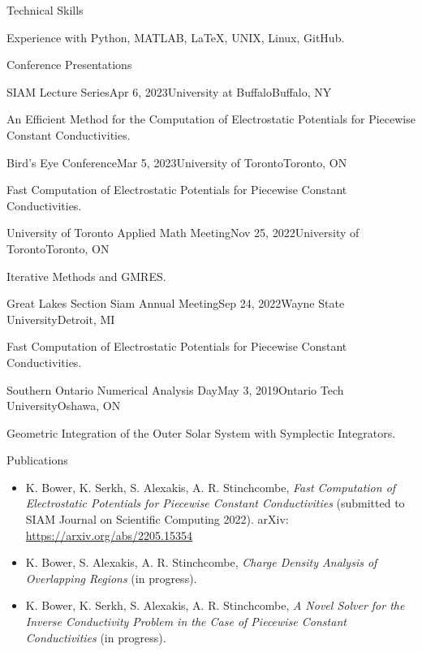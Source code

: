 \documentclass{resume}
\begin{document}
\begin{rSection}{Technical Skills}

{\normalfont Experience with Python, MATLAB, LaTeX, UNIX, Linux, GitHub.}

\end{rSection}

\begin{rSection}{Conference Presentations}

\begin{rSubsection}{SIAM Lecture Series}{Apr 6, 2023}{University at Buffalo}{Buffalo, NY}
\item An Efficient Method for the Computation of Electrostatic Potentials for Piecewise Constant Conductivities.
\end{rSubsection}

\begin{rSubsection}{Bird's Eye Conference}{Mar 5, 2023}{University of Toronto}{Toronto, ON}
\item Fast Computation of Electrostatic Potentials for Piecewise Constant Conductivities.
\end{rSubsection}

\begin{rSubsection}{University of Toronto Applied Math Meeting}{Nov 25, 2022}{University of Toronto}{Toronto, ON}
\item Iterative Methods and GMRES.
\end{rSubsection}

\begin{rSubsection}{Great Lakes Section Siam Annual Meeting}{Sep 24, 2022}{Wayne State University}{Detroit, MI}
\item Fast Computation of Electrostatic Potentials for Piecewise Constant Conductivities.
\end{rSubsection}

\begin{rSubsection}{Southern Ontario Numerical Analysis Day}{May 3, 2019}{Ontario Tech University}{Oshawa, ON}
\item Geometric Integration of the Outer Solar System with Symplectic Integrators.
\end{rSubsection}

\end{rSection}

\begin{rSection}{Publications}
    \begin{itemize}
        \item K. Bower, K. Serkh, S. Alexakis, A. R. Stinchcombe, \textit{Fast Computation of Electrostatic Potentials for Piecewise Constant Conductivities} (submitted to SIAM Journal on Scientific Computing 2022). arXiv: \url{https://arxiv.org/abs/2205.15354}
        \item K. Bower, S. Alexakis, A. R. Stinchcombe, \textit{Charge Density Analysis of Overlapping Regions} (in progress).
        \item K. Bower, K. Serkh, S. Alexakis, A. R. Stinchcombe, \textit{A Novel Solver for the Inverse Conductivity Problem in the Case of Piecewise Constant Conductivities} (in progress).
    \end{itemize}
\end{rSection}
\end{document}
